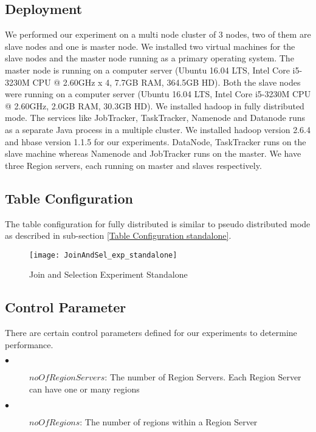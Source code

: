 \documentclass[11pt,a4paper,bibtotoc,idxtotoc,headsepline,footsepline,footexclude,BCOR12mm,DIV13]{scrbook}
\begin{document}
\subsection{Deployment}
We performed our experiment on a multi node cluster of 3 nodes, two of them are slave nodes and one is master node. We installed two virtual machines for the slave nodes and the master node running as a primary operating system. The master node is running on a computer server (Ubuntu 16.04 LTS, Intel Core i5-3230M CPU @ 2.60GHz x 4, 7.7GB RAM, 364.5GB HD). Both the slave nodes were running on a computer server (Ubuntu 16.04 LTS, Intel Core i5-3230M CPU @ 2.60GHz, 2.0GB RAM, 30.3GB HD). We installed hadoop in fully distributed mode. The services like JobTracker, TaskTracker, Namenode and Datanode runs as a separate Java process in a multiple cluster. We installed hadoop version 2.6.4 and hbase version 1.1.5 for our experiments. DataNode, TaskTracker runs on the slave machine whereas Namenode and JobTracker runs on the master. We have three Region servers, each running on master and slaves respectively.

\subsection{Table Configuration}
The table configuration for fully distributed is similar to pseudo distributed mode as described in sub-section \ref{Table Configuration standalone}.

\begin{figure}
	\centering
	\texttt{[image: JoinAndSel\_exp\_standalone]}
	\caption{Join and Selection Experiment Standalone}
	\label{sec:JoinSelExpStandalone}
	
\end{figure} 
\newpage

\subsection{Control Parameter}
\label{Control Parameter Distributed}
There are certain control parameters defined for our experiments to determine performance.

\begin{description}
	\item[$\bullet$]  $noOfRegionServers$: The number of Region Servers. Each Region Server can have one or many regions
\end{description}

\begin{description}
	\item[$\bullet$]  $noOfRegions$: The number of regions within a Region Server 
\end{description}
\end{document}
